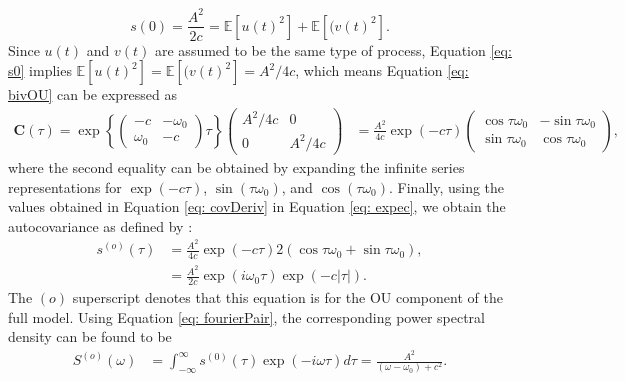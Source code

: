 \documentclass{stat572Style}
\begin{document}
\begin{equation}
\label{eq: s0}
s(0) = \frac{A^{2}}{2c} =  \mathbb{E}[u(t)^{2}] + \mathbb{E}[(v(t)^{2}]. 
\end{equation}
Since $u(t)$ and $v(t)$ are assumed to be the same type of process, Equation \eqref{eq: s0} implies $\mathbb{E}[u(t)^{2}] =\mathbb{E}[(v(t)^{2}] = A^{2}/4c$, which means Equation \eqref{eq: bivOU} can be expressed as 
\begin{align}
\label{eq: covDeriv}
 \boldsymbol{C}(\tau) =  \exp \left\{ \left( \begin{array}{cc} -c & -\omega_{0} \\ \omega_{0} & -c \end{array} \right)\tau \right\} \left( \begin{array}{cc} A^{2}/4c & 0 \\ 0 & A^{2}/4c \end{array} \right)  &= 
\frac{A^{2}}{4c} \exp (-c \tau) \left( \begin{array}{cc} \cos \tau \omega_{0} & - \sin \tau \omega_{0} \\ \sin \tau \omega_{0} & \cos \tau \omega_{0}  \end{array} \right),
\end{align}
where the second equality can be obtained by expanding the infinite series representations for $\exp(-c \tau)$, $\sin(\tau \omega_{0})$, and $\cos( \tau \omega_{0})$. 
Finally, using the values obtained in Equation \eqref{eq: covDeriv} in Equation \eqref{eq: expec}, we obtain the autocovariance  as defined by \citet{Sykulski2016}:
\begin{align}
\label{eq: ouAC} \nonumber
s^{(o)}(\tau) & = \frac{A^{2}}{4c} \exp(-c\tau) 2(\cos \tau \omega_{0} + \sin \tau \omega_{0}), \\
&= \frac{A^{2}}{2c} \exp(i \omega_{0}\tau) \exp(-c|\tau|).
\end{align}
 The $(o)$ superscript denotes that this equation is for the OU component of the full model. Using Equation \eqref{eq: fourierPair}, the corresponding power spectral density can be found to be\begin{align}
\label{eq:ouPSD}
S^{(o)}(\omega) &=  \int_{-\infty}^{\infty} s^{(0)}(\tau) \exp (-i \omega \tau) d \tau = \frac{A^{2}}{(\omega - \omega_{0}) + c^{2}}. 
\end{align}
\end{document}
